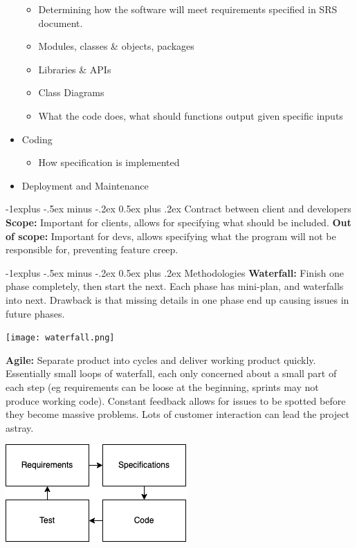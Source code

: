 \documentclass[letterpaper, 8pt]{extarticle}
\makeatletter
\renewcommand{\subsection}{\@startsection{subsection}{2}{0mm}%
                                {-1explus -.5ex minus -.2ex}%
                                {0.5ex plus .2ex}%
                                {\normalfont\small\bfseries}}
\makeatother
\begin{document}
\begin{multicols*}{5}
\begin{itemize}
          \begin{itemize}
            \item Determining how the software will meet requirements specified in SRS document.
            \item Modules, classes \& objects, packages
            \item Libraries \& APIs
            \item Class Diagrams
            \item What the code does, what should functions output given specific inputs
          \end{itemize}
    \item Coding
          \begin{itemize}
            \item How specification is implemented
          \end{itemize}
    \item Deployment and Maintenance
  \end{itemize}
  \subsection{Contract between client and developers}
  \textbf{Scope:} Important for clients, allows for specifying what should be included.
  \textbf{Out of scope:} Important for devs,
  allows specifying what the program will not be responsible for,
  preventing feature creep.

  \subsection{Methodologies}
  \textbf{Waterfall:} Finish one phase completely, then start the next.
  Each phase has mini-plan, and waterfalls into next.
  Drawback is that missing details in one phase
  end up causing issues in future phases.
  \begin{center}
      \texttt{[image: waterfall.png]}
  \end{center}

  \textbf{Agile:} Separate product into cycles
  and deliver working product quickly.
  Essentially small loops of waterfall,
  each only concerned about a small part of each step
  (eg requirements can be loose at the beginning, sprints may not produce working code).
  Constant feedback allows for issues to be spotted before they become massive problems.
  Lots of customer interaction can lead the project astray.
  \begin{center}
      \includegraphics[width=0.6\linewidth]{agile.png}
  \end{center}


\end{multicols*}
\end{document}
